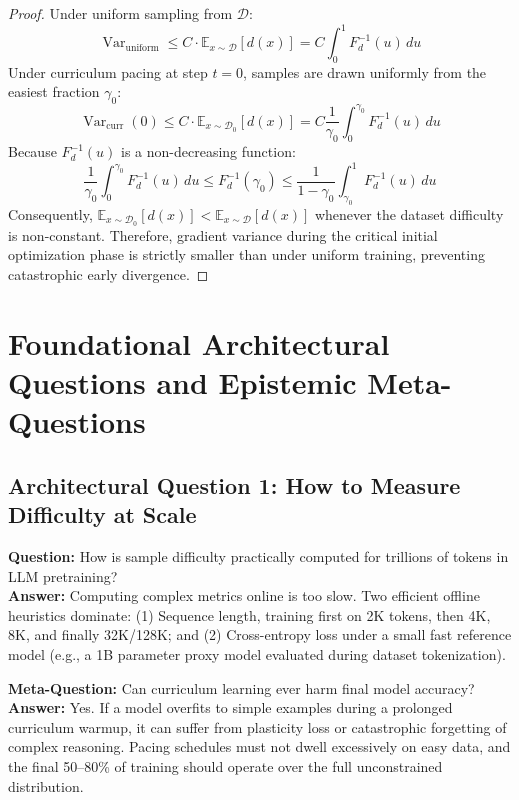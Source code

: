 \documentclass[11pt,a4paper]{article}
\theoremstyle{definition}
\begin{document}
\begin{proof}
Under uniform sampling from $\mathcal{D}$:
{\boldmath
\begin{equation}
\operatorname{Var}_{\text{uniform}} \le C \cdot \mathbb{E}_{x \sim \mathcal{D}}[d(x)] = C \int_0^1 F_d^{-1}(u) \, du
\end{equation}
}
Under curriculum pacing at step $t=0$, samples are drawn uniformly from the easiest fraction $\gamma_0$:
{\boldmath
\begin{equation}
\operatorname{Var}_{\text{curr}}(0) \le C \cdot \mathbb{E}_{x \sim \mathcal{D}_0}[d(x)] = C \frac{1}{\gamma_0} \int_0^{\gamma_0} F_d^{-1}(u) \, du
\end{equation}
}
Because $F_d^{-1}(u)$ is a non-decreasing function:
{\boldmath
\begin{equation}
\frac{1}{\gamma_0} \int_0^{\gamma_0} F_d^{-1}(u) \, du \le F_d^{-1}(\gamma_0) \le \frac{1}{1 - \gamma_0} \int_{\gamma_0}^1 F_d^{-1}(u) \, du
\end{equation}
}
Consequently, $\mathbb{E}_{x \sim \mathcal{D}_0}[d(x)] < \mathbb{E}_{x \sim \mathcal{D}}[d(x)]$ whenever the dataset difficulty is non-constant.
Therefore, gradient variance during the critical initial optimization phase is strictly smaller than under uniform training, preventing catastrophic early divergence.
\end{proof}

\section{Foundational Architectural Questions and Epistemic Meta-Questions}

\subsection{Architectural Question 1: How to Measure Difficulty at Scale}
\textbf{Question:} How is sample difficulty practically computed for trillions of tokens in LLM pretraining?\\
\textbf{Answer:} Computing complex metrics online is too slow. Two efficient offline heuristics dominate: (1) Sequence length, training first on 2K tokens, then 4K, 8K, and finally 32K/128K; and (2) Cross-entropy loss under a small fast reference model (e.g., a 1B parameter proxy model evaluated during dataset tokenization).

\textbf{Meta-Question:} Can curriculum learning ever harm final model accuracy?\\
\textbf{Answer:} Yes. If a model overfits to simple examples during a prolonged curriculum warmup, it can suffer from plasticity loss or catastrophic forgetting of complex reasoning. Pacing schedules must not dwell excessively on easy data, and the final 50--80\% of training should operate over the full unconstrained distribution.
\end{document}
